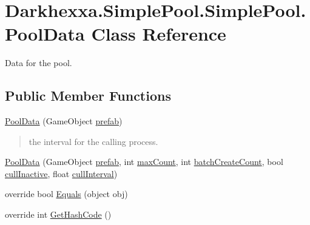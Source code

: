 \hypertarget{class_darkhexxa_1_1_simple_pool_1_1_simple_pool_1_1_pool_data}{\section{Darkhexxa.\-Simple\-Pool.\-Simple\-Pool.\-Pool\-Data Class Reference}
\label{class_darkhexxa_1_1_simple_pool_1_1_simple_pool_1_1_pool_data}
}


Data for the pool.  


\subsection*{Public Member Functions}
\begin{DoxyCompactItemize}
\item 
\hyperlink{class_darkhexxa_1_1_simple_pool_1_1_simple_pool_1_1_pool_data_a362fa5c969fb8230d2248dd6d8590b65}{Pool\-Data} (Game\-Object \hyperlink{class_darkhexxa_1_1_simple_pool_1_1_simple_pool_1_1_pool_data_afeeca245f87b8bef8c5a954c7b78011c}{prefab})
\begin{DoxyCompactList}\small\item\em \begin{quotation}
the interval for the calling process. \end{quotation}
\end{DoxyCompactList}\item 
\hyperlink{class_darkhexxa_1_1_simple_pool_1_1_simple_pool_1_1_pool_data_a0b538556ad116b32f300845651d86a30}{Pool\-Data} (Game\-Object \hyperlink{class_darkhexxa_1_1_simple_pool_1_1_simple_pool_1_1_pool_data_afeeca245f87b8bef8c5a954c7b78011c}{prefab}, int \hyperlink{class_darkhexxa_1_1_simple_pool_1_1_simple_pool_1_1_pool_data_ae2d66b8c6f3d77721c5ca3474cac1311}{max\-Count}, int \hyperlink{class_darkhexxa_1_1_simple_pool_1_1_simple_pool_1_1_pool_data_a7277e7f63a6189198b789f74db585a94}{batch\-Create\-Count}, bool \hyperlink{class_darkhexxa_1_1_simple_pool_1_1_simple_pool_1_1_pool_data_a19c48ea469a33d4188a996482939d665}{cull\-Inactive}, float \hyperlink{class_darkhexxa_1_1_simple_pool_1_1_simple_pool_1_1_pool_data_abf0fe104db5c39105f7c88dca1581bc1}{cull\-Interval})
\item 
override bool \hyperlink{class_darkhexxa_1_1_simple_pool_1_1_simple_pool_1_1_pool_data_a3b57abc0a9ad8594aba92e4987869e72}{Equals} (object obj)
\item 
override int \hyperlink{class_darkhexxa_1_1_simple_pool_1_1_simple_pool_1_1_pool_data_ac38a6df31961bb203a80c01d5d4b855c}{Get\-Hash\-Code} ()
\end{DoxyCompactItemize}
